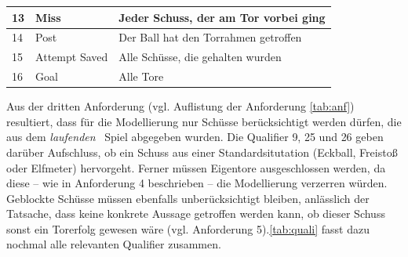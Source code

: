 \tablelasttail{}
\begin{center}%
\begin{supertabular}{ | P{2cm} | P{3cm} | P{5cm} |}
\vspace*{1mm} 13 	& \vspace*{1mm}Miss  	& Jeder Schuss, der am Tor vorbei ging	\\
\hline
\vspace*{1mm}14	& \vspace*{1mm}Post	& Der Ball hat den Torrahmen getroffen 	\\
\hline
\vspace*{1mm}15	& \vspace*{1mm}Attempt Saved  	& Alle Schüsse, die gehalten wurden	\\
\hline
\vspace*{1mm}16\vspace*{1mm}	& \vspace*{1mm}Goal\vspace*{1mm}  	& \vspace*{1mm}Alle Tore\vspace*{1mm}	\\
\hline
\end{supertabular}
\end{center}

Aus der dritten Anforderung (vgl. Auflistung der Anforderung \vref{tab:anf}) resultiert, dass für die Modellierung nur Schüsse berücksichtigt werden dürfen, die aus dem \glqq \textit{laufenden}\grqq~ Spiel abgegeben wurden. Die Qualifier \textsf{9, 25} und \textsf{26} geben darüber Aufschluss, ob ein Schuss aus einer Standardsitutation (Eckball, Freistoß oder Elfmeter) hervorgeht. Ferner müssen Eigentore ausgeschlossen werden, da diese -- wie in Anforderung 4 beschrieben -- die Modellierung verzerren würden. Geblockte Schüsse müssen ebenfalls unberücksichtigt bleiben, anlässlich der Tatsache, dass keine konkrete Aussage getroffen werden kann, ob dieser Schuss sonst ein Torerfolg gewesen wäre (vgl. Anforderung 5).\vref{tab:quali} fasst dazu nochmal alle relevanten Qualifier zusammen.

